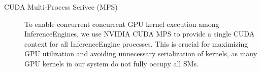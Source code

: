 \begin{description}
    \item[CUDA Multi-Process Serivce (MPS) \cite{CUDA_MPS}] To enable concurrent concurrent GPU kernel execution among InferenceEngines, we use NVIDIA CUDA MPS to provide a single CUDA context for all InferenceEngine processes. This is crucial for maximizing GPU utilization and avoiding unnecessary serialization of kernels, as many GPU kernels in our system do not fully occupy all SMs.
\end{description}

